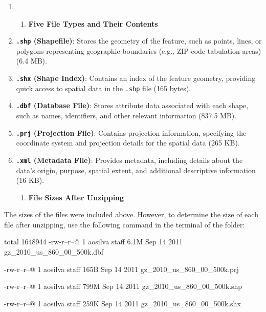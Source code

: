 \documentclass[
  letterpaper,
  DIV=11,
  numbers=noendperiod]{scrartcl}
\providecommand{\tightlist}{%
  \setlength{\itemsep}{0pt}\setlength{\parskip}{0pt}}\usepackage{longtable,booktabs,array}
\begin{document}
\begin{enumerate}
\def\labelenumi{\arabic{enumi}.}
\item
  \begin{enumerate}
  \def\labelenumii{\alph{enumii}.}
  \tightlist
  \item
    \textbf{Five File Types and Their Contents}
  \end{enumerate}
\item
  \textbf{\texttt{.shp} (Shapefile)}: Stores the geometry of the
  feature, such as points, lines, or polygons representing geographic
  boundaries (e.g., ZIP code tabulation areas) (6.4 MB).
\item
  \textbf{\texttt{.shx} (Shape Index)}: Contains an index of the feature
  geometry, providing quick access to spatial data in the \texttt{.shp}
  file (165 bytes).
\item
  \textbf{\texttt{.dbf} (Database File)}: Stores attribute data
  associated with each shape, such as names, identifiers, and other
  relevant information (837.5 MB).
\item
  \textbf{\texttt{.prj} (Projection File)}: Contains projection
  information, specifying the coordinate system and projection details
  for the spatial data (265 KB).
\item
  \textbf{\texttt{.xml} (Metadata File)}: Provides metadata, including
  details about the data's origin, purpose, spatial extent, and
  additional descriptive information (16 KB).

  \begin{enumerate}
  \def\labelenumii{\alph{enumii}.}
  \setcounter{enumii}{1}
  \tightlist
  \item
    \textbf{File Sizes After Unzipping}
  \end{enumerate}
\end{enumerate}

The sizes of the files were included above. However, to determine the
size of each file after unzipping, use the following command in the
terminal of the folder:

total 1648944 -rw-r--r--@ 1 aosilva staff 6.1M Sep 14 2011
gz\_2010\_us\_860\_00\_500k.dbf

-rw-r--r--@ 1 aosilva staff 165B Sep 14 2011
gz\_2010\_us\_860\_00\_500k.prj

-rw-r--r--@ 1 aosilva staff 799M Sep 14 2011
gz\_2010\_us\_860\_00\_500k.shp

-rw-r--r--@ 1 aosilva staff 259K Sep 14 2011
gz\_2010\_us\_860\_00\_500k.shx
\end{document}
